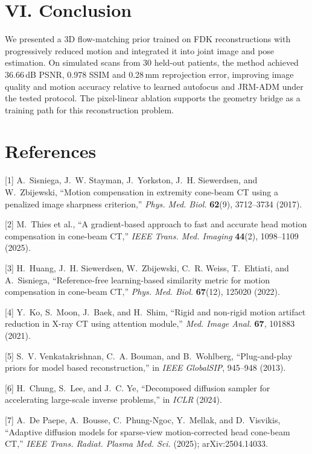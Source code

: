 \documentclass[11pt]{article}
\begin{document}
\section{VI. Conclusion}


We presented a 3D flow-matching prior trained on FDK reconstructions with progressively
reduced motion and integrated it into joint image and pose estimation. On simulated
scans from 30 held-out patients, the method achieved 36.66\,dB PSNR, 0.978 SSIM and
0.28\,mm reprojection error, improving image quality and motion accuracy relative to
learned autofocus and JRM-ADM under the tested protocol. The pixel-linear ablation
supports the geometry bridge as a training path for this reconstruction problem.

\section*{References}

[1] A.~Sisniega, J.~W. Stayman, J.~Yorkston, J.~H. Siewerdsen, and W.~Zbijewski, ``Motion compensation in extremity cone-beam CT using a penalized image sharpness criterion,'' \emph{Phys. Med. Biol.} \textbf{62}(9), 3712--3734 (2017).


[2] M.~Thies et al., ``A gradient-based approach to fast and accurate head motion compensation in cone-beam CT,'' \emph{IEEE Trans. Med. Imaging} \textbf{44}(2), 1098--1109 (2025).


[3] H.~Huang, J.~H. Siewerdsen, W.~Zbijewski, C.~R. Weiss, T.~Ehtiati, and A.~Sisniega, ``Reference-free learning-based similarity metric for motion compensation in cone-beam CT,'' \emph{Phys. Med. Biol.} \textbf{67}(12), 125020 (2022).


[4] Y.~Ko, S.~Moon, J.~Baek, and H.~Shim, ``Rigid and non-rigid motion artifact reduction in X-ray CT using attention module,'' \emph{Med. Image Anal.} \textbf{67}, 101883 (2021).


[5] S.~V. Venkatakrishnan, C.~A. Bouman, and B.~Wohlberg, ``Plug-and-play priors for model based reconstruction,'' in \emph{IEEE GlobalSIP}, 945--948 (2013).


[6] H.~Chung, S.~Lee, and J.~C. Ye, ``Decomposed diffusion sampler for accelerating large-scale inverse problems,'' in \emph{ICLR} (2024).


[7] A.~De Paepe, A.~Bousse, C.~Phung-Ngoc, Y.~Mellak, and D.~Visvikis, ``Adaptive diffusion models for sparse-view motion-corrected head cone-beam CT,'' \emph{IEEE Trans. Radiat. Plasma Med. Sci.} (2025); arXiv:2504.14033.
\end{document}
